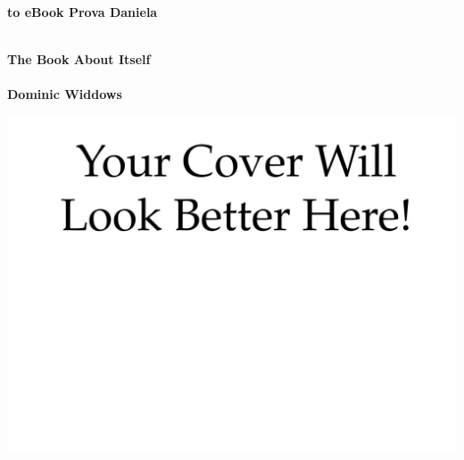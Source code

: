 
\thispagestyle{empty}

\vspace{3cm}
  \begin{center}
	\bfseries \Huge \latex to eBook Prova Daniela \par   %
        ~\\
	\bfseries \LARGE The Book About Itself \\   %
        ~\\
        \bfseries \Large Dominic Widdows \par   %

        \vspace{3cm}
    
      	{\centering \includegraphics[width=0.8\linewidth]{images/cover.png}}
    \end{center}
    
\par

\newpage
